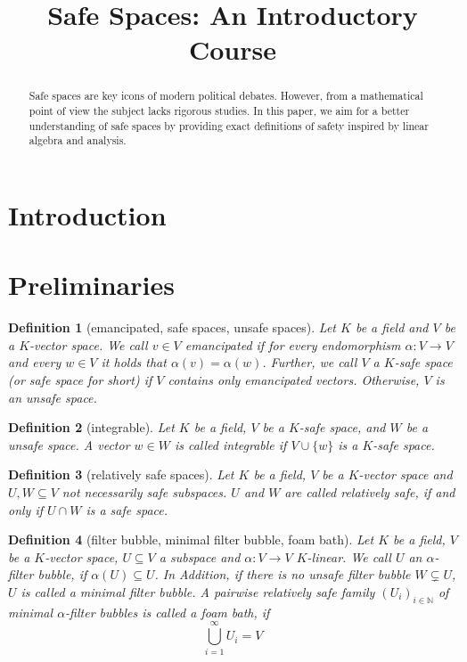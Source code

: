 \documentclass[]{article}
\newtheorem{definition}{Definition}
\begin{document}
\title{Safe Spaces: An Introductory Course}

\maketitle 

\begin{abstract}
Safe spaces are key icons of modern political debates. However, from a mathematical point of view the subject lacks rigorous studies. In this paper, we aim for a better understanding of safe spaces by providing exact definitions of safety inspired by linear algebra and analysis. 
\end{abstract}

\section{Introduction}



\section{Preliminaries}

\begin{definition}[emancipated, safe spaces, unsafe spaces]
	Let $K$ be a field and $V$ be a $K$-vector space. We call $v \in V$ \emph{emancipated} if for every endomorphism $\alpha: V \to V$ and every $w \in V$ it holds that $\alpha(v) = \alpha(w)$. Further, we call $V$ a \emph{$K$-safe space} (or \emph{safe space} for short) if $V$ contains only emancipated vectors. Otherwise, $V$ is an \emph{unsafe space}.
\end{definition}


\begin{definition}[integrable]
	Let $K$ be a field, $V$ be a $K$-safe space, and $W$ be a unsafe space.
	A vector $w \in W$ is called \emph{integrable} if $V \cup \{w\}$ is a $K$-safe space.
\end{definition}

\begin{definition}[relatively safe spaces]
    Let $K$ be a field, $V$ be a $K$-vector space and $U, W \subseteq V $ not
    necessarily safe subspaces. $U$ and $W$ are called \emph{relatively safe}, if
    and only if $U \cap W$ is a safe space.
\end{definition}

\begin{definition}[filter bubble, minimal filter bubble, foam bath]
    Let $K$ be a field, $V$ be a $K$-vector space, $U \subseteq V$ a subspace
    and $\alpha: V \to V$ $K$-linear. We call $U$ an
    \emph{$\alpha$-filter bubble}, if $\alpha(U) \subseteq U$. In Addition, if
    there is no unsafe filter bubble $W \subsetneq U$, $U$ is called a \emph{minimal
        filter bubble}. A pairwise relatively safe family $(U_i)_{i \in \mathbb
    N}$ of minimal $\alpha$-filter bubbles is called a \emph{foam bath}, if
    \[
        \bigcup_{i = 1}^\infty U_i = V
    \]
\end{definition}
\end{document}
